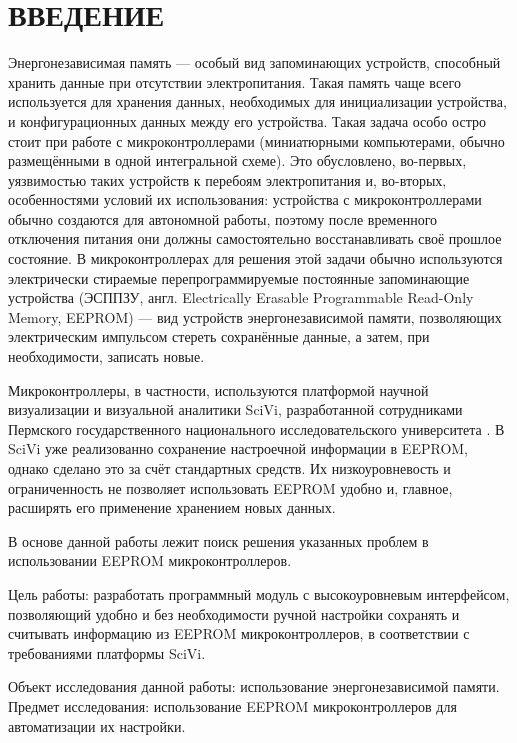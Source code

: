\chapter*{ВВЕДЕНИЕ}

Энергонезависимая память --- особый вид запоминающих устройств, способный хранить данные при отсутствии электропитания.
Такая память чаще всего используется для хранения данных, необходимых для инициализации устройства, и конфигурационных данных между его устройства.
Такая задача особо остро стоит при работе с микроконтроллерами (миниатюрными компьютерами, обычно размещёнными в одной интегральной схеме). Это обусловлено, во-первых, уязвимостью таких устройств к перебоям электропитания и, во-вторых, особенностями условий их использования: устройства с микроконтроллерами обычно создаются для автономной работы, поэтому после временного отключения питания они должны самостоятельно восстанавливать своё прошлое состояние.
В микроконтроллерах для решения этой задачи обычно используются электрически стираемые перепрограммируемые постоянные запоминающие устройства (ЭСППЗУ, англ. Electrically Erasable Programmable Read-Only Memory, EEPROM) --- вид устройств энергонезависимой памяти, позволяющих электрическим импульсом стереть сохранённые данные, а затем, при необходимости, записать новые.

Микроконтроллеры, в частности, используются платформой научной визуализации и визуальной аналитики SciVi, разработанной сотрудниками Пермского государственного национального исследовательского университета \cite{article:scivi}.
В SciVi уже реализованно сохранение настроечной информации в EEPROM, однако сделано это за счёт стандартных средств. Их низкоуровневость и ограниченность не позволяет использовать EEPROM удобно и, главное, расширять его применение хранением новых данных.

В основе данной работы лежит поиск решения указанных проблем в использовании EEPROM микроконтроллеров.

Цель работы: разработать программный модуль с высокоуровневым интерфейсом, позволяющий удобно и без необходимости ручной настройки сохранять и считывать информацию из EEPROM микроконтроллеров, в соответствии с требованиями платформы SciVi.

Объект исследования данной работы: использование энергонезависимой памяти.
Предмет исследования: использование EEPROM микроконтроллеров для автоматизации их настройки.

